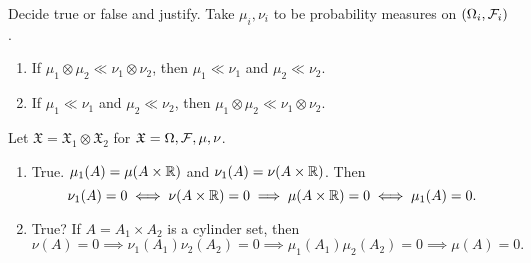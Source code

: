 \documentclass[12pt]{article}
\begin{document}
\begin{problem*}
    Decide true or false and justify.
    Take $\mu_i, \nu_i$ to be probability measures on $(\Omega_i, \mathcal{F}_i)$.
    \begin{enumerate}
        \item If $\mu_1 \otimes \mu_2 \ll \nu_1 \otimes \nu_2$, then
            $\mu_1 \ll \nu_1$ and $\mu_2 \ll \nu_2$.
        \item If $\mu_1 \ll \nu_1$ and $\mu_2 \ll \nu_2$, then
            $\mu_1 \otimes \mu_2 \ll \nu_1 \otimes \nu_2$.
    \end{enumerate}
\end{problem*}
\begin{solution}
    Let $\mathfrak X = \mathfrak X_1 \otimes \mathfrak X_2$ for
    $\mathfrak X = \Omega, \mathcal{F}, \mu, \nu$.
    \begin{enumerate}
        \item True.
        $\mu_1(A) = \mu(A \times \mathbb{R})$ and $\nu_1(A) = \nu(A \times \mathbb{R})$.
        Then \[
            \nu_1(A) = 0 \iff \nu(A \times \mathbb{R}) = 0
                \implies \mu(A \times \mathbb{R}) = 0
                \iff \mu_1(A) = 0.
        \]
        \item True?
        If $A = A_1 \times A_2$ is a cylinder set, then \[
            \nu(A) = 0 \implies \nu_1(A_1) \nu_2(A_2) = 0
                \implies \mu_1(A_1) \mu_2(A_2) = 0
                \implies \mu(A) = 0.
        \]
    \end{enumerate}
\end{solution}
\end{document}
